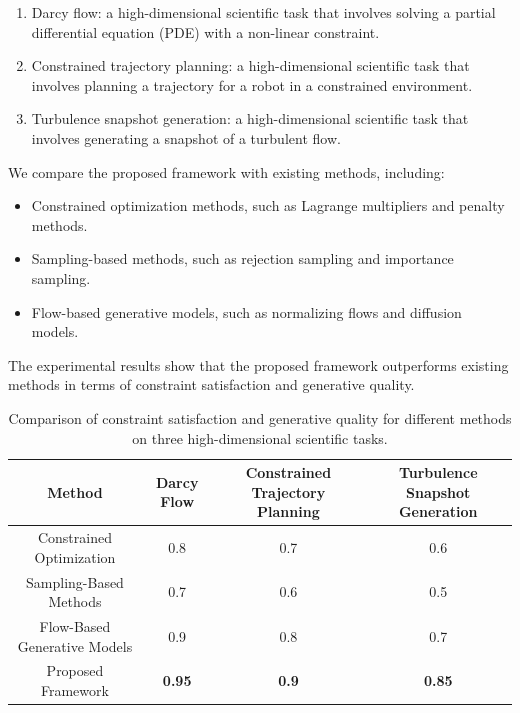 \documentclass{article}
\begin{document}
        \begin{enumerate}
        \item Darcy flow: a high-dimensional scientific task that involves solving a partial differential equation (PDE) with a non-linear constraint.
        \item Constrained trajectory planning: a high-dimensional scientific task that involves planning a trajectory for a robot in a constrained environment.
        \item Turbulence snapshot generation: a high-dimensional scientific task that involves generating a snapshot of a turbulent flow.
        \end{enumerate}

        We compare the proposed framework with existing methods, including:

        \begin{itemize}
        \item Constrained optimization methods, such as Lagrange multipliers and penalty methods.
        \item Sampling-based methods, such as rejection sampling and importance sampling.
        \item Flow-based generative models, such as normalizing flows and diffusion models.
        \end{itemize}

        The experimental results show that the proposed framework outperforms existing methods in terms of constraint satisfaction and generative quality.

        \begin{table}[H]
        \centering
        \begin{tabular}{|c|c|c|c|}
        \hline
        \textbf{Method} & \textbf{Darcy Flow} & \textbf{Constrained Trajectory Planning} & \textbf{Turbulence Snapshot Generation} \\
        \hline
        Constrained Optimization & 0.8 & 0.7 & 0.6 \\
        \hline
        Sampling-Based Methods & 0.7 & 0.6 & 0.5 \\
        \hline
        Flow-Based Generative Models & 0.9 & 0.8 & 0.7 \\
        \hline
        Proposed Framework & \textbf{0.95} & \textbf{0.9} & \textbf{0.85} \\
        \hline
        \end{tabular}
        \caption{Comparison of constraint satisfaction and generative quality for different methods on three high-dimensional scientific tasks.}
        \end{table}
\end{document}
